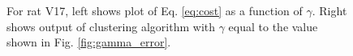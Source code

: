 \documentclass[superscriptaddress, twocolumn, prl]{revtex4}
\begin{document}
\begin{figure}
\centering
{}
\caption{For rat V17, left shows plot of Eq. \ref{eq:cost} as a function of $\gamma$. Right shows output of clustering algorithm with $\gamma$ equal to the value shown in Fig. \ref{fig:gamma_error}.}
\end{figure}
\end{document}
